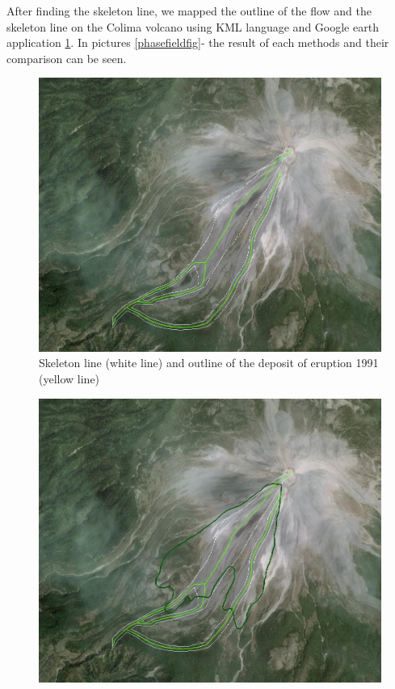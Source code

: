 \documentclass[letterpaper,10pt]{article}
\begin{document}
\newpage

After finding the skeleton line, we mapped the outline of the flow and the skeleton line on the Colima volcano 
using KML language and Google earth application \ref{skel_outline}. In pictures \ref{phasefieldfig}-
the result of each methods and their comparison can be seen. 

\begin{figure}[H]
\centerline{\includegraphics[width=\textwidth]{IMAGES/skeleton_outline1.jpg}}
\caption{Skeleton line (white line) and outline of the deposit of eruption 1991 (yellow line)}
\label{skel_outline}
\end{figure}

\begin{figure}[H]
\centerline{\includegraphics[width=\textwidth]{IMAGES/phasefield1.jpg}}
\caption{}
\label{phasecolima}
\end{figure}
\end{document}
